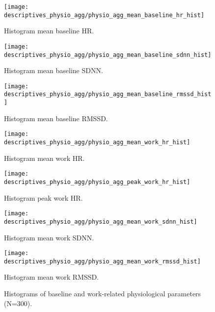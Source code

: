 \documentclass[11pt, a4paper]{report}
\begin{document}
\begin{figure}[H]
    \centering
    \begin{minipage}{0.48\textwidth}
        \texttt{[image: descriptives\_physio\_agg/physio\_agg\_mean\_baseline\_hr\_hist]}
        \caption{Histogram mean baseline HR.}
        \label{fig:hist_physio_baseline_start_results}
    \end{minipage}\hfill
    \begin{minipage}{0.48\textwidth}
        \texttt{[image: descriptives\_physio\_agg/physio\_agg\_mean\_baseline\_sdnn\_hist]}
        \caption{Histogram mean baseline SDNN.}
    \end{minipage}
    \vspace{\floatsep} %
    \begin{minipage}{0.48\textwidth}
        \texttt{[image: descriptives\_physio\_agg/physio\_agg\_mean\_baseline\_rmssd\_hist]}
        \caption{Histogram mean baseline RMSSD.}
    \end{minipage}\hfill
    \begin{minipage}{0.48\textwidth}
        \texttt{[image: descriptives\_physio\_agg/physio\_agg\_mean\_work\_hr\_hist]}
        \caption{Histogram mean work HR.}
    \end{minipage}
    \vspace{\floatsep}
    \begin{minipage}{0.48\textwidth}
        \texttt{[image: descriptives\_physio\_agg/physio\_agg\_peak\_work\_hr\_hist]}
        \caption{Histogram peak work HR.}
    \end{minipage}\hfill
    \begin{minipage}{0.48\textwidth}
        \texttt{[image: descriptives\_physio\_agg/physio\_agg\_mean\_work\_sdnn\_hist]}
        \caption{Histogram mean work SDNN.}
    \end{minipage}
     \vspace{\floatsep}
    \begin{minipage}{0.48\textwidth}
        \texttt{[image: descriptives\_physio\_agg/physio\_agg\_mean\_work\_rmssd\_hist]}
        \caption{Histogram mean work RMSSD.}
        \label{fig:hist_physio_baseline_end_results}
    \end{minipage}
    \caption{Histograms of baseline and work-related physiological parameters (N=300).}
\end{figure}
\end{document}
